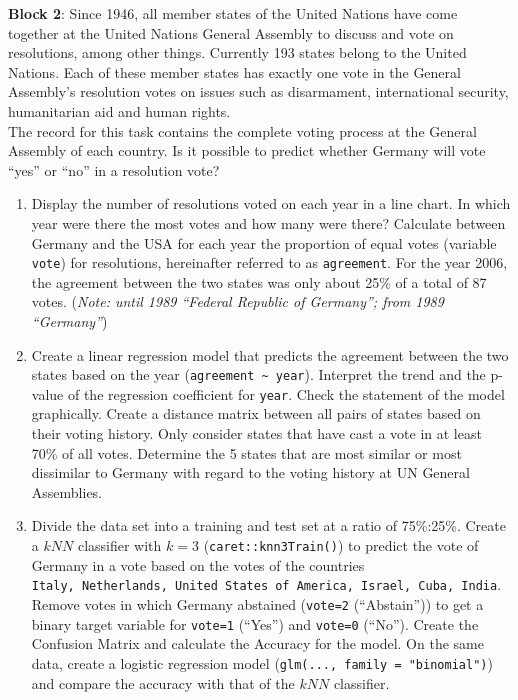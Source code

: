 \documentclass[11pt,]{article}
\providecommand{\tightlist}{%
  \setlength{\itemsep}{0pt}\setlength{\parskip}{0pt}}
\begin{document}
\textbf{Block 2}: Since 1946, all member states of the United Nations
have come together at the United Nations General Assembly to discuss and
vote on resolutions, among other things. Currently 193 states belong to
the United Nations. Each of these member states has exactly one vote in
the General Assembly's resolution votes on issues such as disarmament,
international security, humanitarian aid and human rights.\\
The record for this task contains the complete voting process at the
General Assembly of each country. Is it possible to predict whether
Germany will vote ``yes'' or ``no'' in a resolution vote?

\begin{enumerate}
\def\labelenumi{\arabic{enumi}.}
\setcounter{enumi}{3}
\tightlist
\item
  Display the number of resolutions voted on each year in a line chart.
  In which year were there the most votes and how many were there?
  Calculate between Germany and the USA for each year the proportion of
  equal votes (variable \texttt{vote}) for resolutions, hereinafter
  referred to as \texttt{agreement}. For the year 2006, the agreement
  between the two states was only about 25\% of a total of 87 votes.
  (\emph{Note: until 1989 ``Federal Republic of Germany''; from 1989
  ``Germany''})
\item
  Create a linear regression model that predicts the agreement between
  the two states based on the year
  (\texttt{agreement\ \textasciitilde{}\ year}). Interpret the trend and
  the p-value of the regression coefficient for \texttt{year}. Check the
  statement of the model graphically. Create a distance matrix between
  all pairs of states based on their voting history. Only consider
  states that have cast a vote in at least 70\% of all votes. Determine
  the 5 states that are most similar or most dissimilar to Germany with
  regard to the voting history at UN General Assemblies.
\item
  Divide the data set into a training and test set at a ratio of
  75\%:25\%. Create a \(kNN\) classifier with \(k=3\)
  (\texttt{caret::knn3Train()}) to predict the vote of Germany in a vote
  based on the votes of the countries
  \texttt{\textquotesingle{}Italy\textquotesingle{},\ \textquotesingle{}Netherlands\textquotesingle{},\ \textquotesingle{}United\ States\ of\ America\textquotesingle{},\ \textquotesingle{}Israel\textquotesingle{},\ \textquotesingle{}Cuba\textquotesingle{},\ \textquotesingle{}India\textquotesingle{}}.
  Remove votes in which Germany abstained (\texttt{vote=2}
  (``Abstain'')) to get a binary target variable for \texttt{vote=1}
  (``Yes'') and \texttt{vote=0} (``No''). Create the Confusion Matrix
  and calculate the Accuracy for the model. On the same data, create a
  logistic regression model (\texttt{glm(...,\ family\ =\ "binomial")})
  and compare the accuracy with that of the \(kNN\) classifier.
\end{enumerate}
\end{document}
